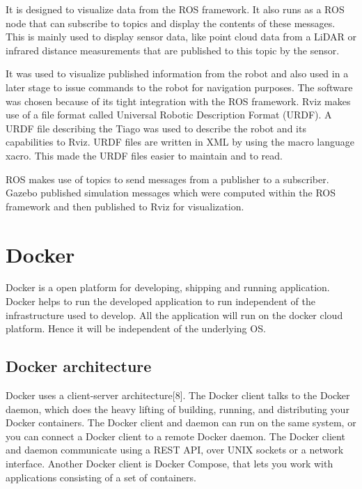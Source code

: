 It is designed to visualize data from the ROS framework. It also runs as a ROS node that can subscribe
to topics and display the contents of these messages. This is mainly used to display sensor data, like
point cloud data from a LiDAR or infrared distance measurements that are published to this topic by the
sensor.

It was used to visualize published information from the robot and also used in a later stage to issue
commands to the robot for navigation purposes. The software was chosen because of its tight
integration with the ROS framework. Rviz makes use of a file format called Universal Robotic
Description Format (URDF). A URDF file describing the Tiago was used to describe the robot and its
capabilities to Rviz. URDF files are written in XML by using the macro language xacro. This made the
URDF files easier to maintain and to read.

ROS makes use of topics to send messages from a publisher to a subscriber. Gazebo published
simulation messages which were computed within the ROS framework and then published to Rviz for
visualization. 


\section{Docker}

Docker is a open platform for developing, shipping and running application. Docker helps to run the developed application to run independent of the infrastructure used to develop. All the application will run on the docker cloud platform. Hence it will be independent of the underlying OS.

\subsection{Docker architecture}
Docker uses a client-server architecture[8]. The Docker client talks to the Docker daemon, which does the heavy lifting of building, running, and distributing your Docker containers. The Docker client and daemon can run on the same system, or you can connect a Docker client to a remote Docker daemon. The Docker client and daemon communicate using a REST API, over UNIX sockets or a network interface. Another Docker client is Docker Compose, that lets you work with applications consisting of a set of containers.

